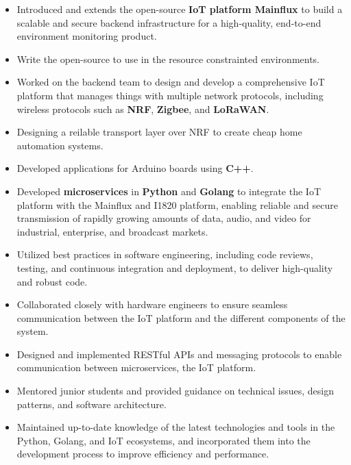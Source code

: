 \vspace{1cm}

\vspace{0.5cm}
\begin{itemize}
  \item Introduced and extends the open-source \textbf{IoT platform Mainflux} to build a scalable and secure backend
    infrastructure for a high-quality, end-to-end environment monitoring product.
  \item Write the open-source  to use in the resource constrainted environments.
  \item Worked on the backend team to design and develop a comprehensive IoT platform that manages things with multiple network protocols,
    including wireless protocols such as \textbf{NRF}, \textbf{Zigbee}, and \textbf{LoRaWAN}.
  \item Designing a reilable transport layer over NRF to create cheap home automation systems.
  \item Developed applications for Arduino boards using \textbf{C++}.
  \item Developed \textbf{microservices} in \textbf{Python} and \textbf{Golang} to integrate the IoT platform with the Mainflux and I1820 platform,
    enabling reliable and secure transmission of rapidly growing amounts of data, audio, and video for industrial, enterprise, and broadcast markets.
  \item Utilized best practices in software engineering, including code reviews, testing, and continuous
    integration and deployment, to deliver high-quality and robust code.
  \item Collaborated closely with hardware engineers to ensure seamless communication between the IoT
    platform and the different components of the system.
  \item Designed and implemented RESTful APIs and messaging protocols to
    enable communication between microservices, the IoT platform.
  \item Mentored junior students and provided guidance on technical issues,
    design patterns, and software architecture.
  \item Maintained up-to-date knowledge of the latest technologies and tools in the Python,
    Golang, and IoT ecosystems, and incorporated them into the development process to improve efficiency and performance.

\end{itemize}
